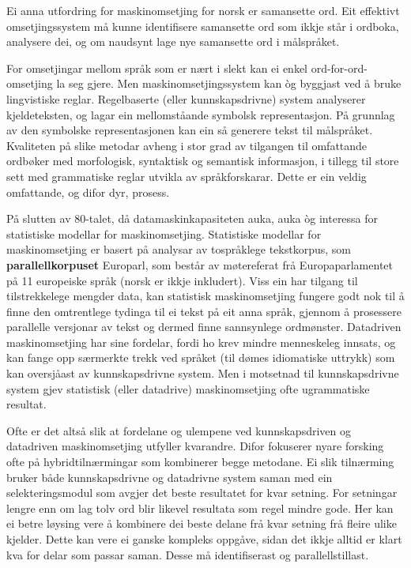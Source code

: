 \begin{multicols}{2}
Ei anna utfordring for maskinomsetjing for norsk er samansette ord. Eit effektivt omsetjingssystem må kunne identifisere samansette ord som ikkje står i ordboka, analysere dei, og om naudsynt lage nye samansette ord i målspråket.

For omsetjingar mellom språk som er nært i slekt kan ei enkel ord-for-ord-omsetjing la seg gjere. Men maskinomsetjingssystem kan òg byggjast ved å bruke lingvistiske reglar. Regelbaserte (eller kunnskapsdrivne) system analyserer kjeldeteksten, og lagar ein mellomståande symbolsk representasjon. På grunnlag av den symbolske representasjonen kan ein så generere tekst til målspråket. Kvaliteten på slike metodar avheng i stor grad av tilgangen til omfattande ordbøker med morfologisk, syntaktisk og semantisk informasjon, i tillegg til store sett med grammatiske reglar utvikla av språkforskarar. Dette er ein veldig omfattande, og difor dyr, prosess.

På slutten av 80-talet, då datamaskinkapasiteten auka, auka òg interessa for statistiske modellar for maskinomsetjing. Statistiske modellar for maskinomsetjing er basert på analysar av tospråklege tekstkorpus, som \textbf{parallellkorpuset} Europarl, som består av møtereferat frå Europaparlamentet på 11 europeiske språk 
(norsk er ikkje inkludert).
Viss ein har tilgang til tilstrekkelege mengder data, kan statistisk maskinomsetjing fungere godt nok til å finne den omtrentlege tydinga til ei tekst på eit anna språk, gjennom å prosessere parallelle versjonar av tekst og dermed finne sannsynlege ordmønster. Datadriven maskinomsetjing har sine fordelar, fordi ho krev mindre menneskeleg innsats, og kan fange opp særmerkte trekk ved språket (til dømes idiomatiske uttrykk) som kan oversjåast av kunnskapsdrivne system. Men i motsetnad til kunnskapsdrivne system gjev statistisk (eller datadrive) maskinomsetjing ofte ugrammatiske resultat.  

Ofte er det altså slik at fordelane og ulempene ved kunnskapsdriven og datadriven maskinomsetjing utfyller kvarandre. Difor fokuserer nyare forsking ofte på hybridtilnærmingar som kombinerer begge metodane. Ei slik tilnærming bruker både kunnskapsdrivne og datadrivne system saman med ein selekteringsmodul som avgjer det beste resultatet for kvar setning. For setningar lengre enn om lag tolv ord blir likevel resultata som regel mindre gode. Her kan ei betre løysing vere å kombinere dei beste delane frå kvar setning frå fleire ulike kjelder. Dette kan vere ei ganske kompleks oppgåve, sidan det ikkje alltid er klart kva for delar som passar saman. Desse må identifiserast og parallellstillast.   


\end{multicols}
